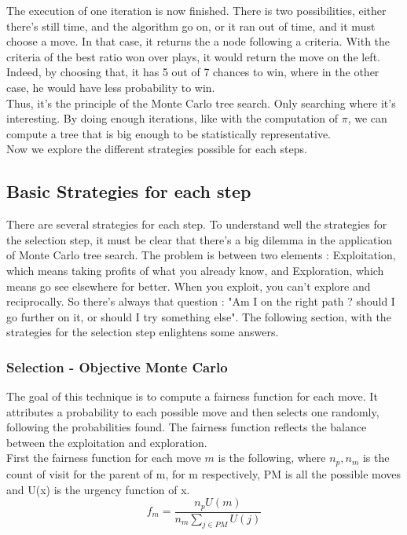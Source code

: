 The execution of one iteration is now finished. There is two possibilities, either there's still time, and the algorithm go on, or it ran out of time, and it must choose a move. In that case, it returns the a node following a criteria. With the criteria of the best ratio won over plays, it would return the move on the left. Indeed, by choosing that, it has 5 out of 7 chances to win, where in the other case, he would have less probability to win. 
\\

Thus, it's the principle of the Monte Carlo tree search. Only searching where it's interesting. By doing enough iterations, like with the computation of $\pi$, we can compute a tree that is big enough to be statistically representative. 
\\

Now we explore the different strategies possible for each steps. 

\subsection{Basic Strategies for each step}

There are several strategies for each step. To understand well the strategies for the selection step, it must be clear that there's a big dilemma in the application of Monte Carlo tree search. The problem is between two elements : Exploitation, which means taking profits of what you already know, and Exploration, which means go see elsewhere for better. When you exploit, you can't explore and reciprocally. So there's always that question : "Am I on the right path ? should I go further on it, or should I try something else". 
The following section, with the strategies for the selection step enlightens some answers. 

\subsubsection{Selection - Objective Monte Carlo}

The goal of this technique is to compute a fairness function for each move. It attributes a probability to each possible move and then selects one randomly, following the probabilities found. The fairness function reflects the balance between the exploitation and exploration.
\\

First the fairness function for each move $m$ is the following, where $n_p, n_m$ is the count of visit for the parent of m, for m respectively, PM is all the possible moves and U(x) is the urgency function of x. 
$$
f_m = \frac{n_p U(m)}{n_m \sum\nolimits_{j \in PM} U(j)}
$$


